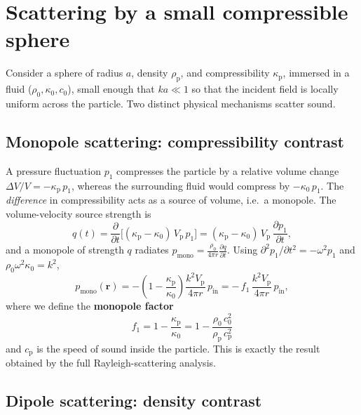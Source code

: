\documentclass[11pt]{article}
\newcommand{\pp}{\rho_{\mathrm{p}}}
\newcommand{\rrho}{\rho_{0}}
\newcommand{\cc}{c_{0}}
\newcommand{\kkp}{\kappa_{\mathrm{p}}}
\newcommand{\kkz}{\kappa_{0}}
\newcommand{\vp}{V_{\mathrm{p}}}
\newcommand{\rr}{\mathbf{r}}
\begin{document}
\section{Scattering by a small compressible sphere}
\label{sec:scattering}

Consider a sphere of radius $a$, density $\pp$, and compressibility $\kkp$,
immersed in a fluid ($\rrho,\kkz,\cc$), small enough that $ka\ll1$ so that the
incident field is locally uniform across the particle. Two distinct physical
mechanisms scatter sound.

\subsection{Monopole scattering: compressibility contrast}

A pressure fluctuation $p_{1}$ compresses the particle by a relative volume
change $\Delta V/V=-\kkp\,p_{1}$, whereas the surrounding fluid would compress
by $-\kkz\,p_{1}$. The \emph{difference} in compressibility acts as a source of
volume, i.e.\ a monopole. The volume-velocity source strength is
\begin{equation}
  q(t)=\frac{\partial}{\partial t}\Big[(\kkp-\kkz)\,\vp\,p_{1}\Big]
      =(\kkp-\kkz)\,\vp\,\frac{\partial p_{1}}{\partial t},
\end{equation}
and a monopole of strength $q$ radiates
$p_{\mathrm{mono}}=\frac{\rrho}{4\pi r}\frac{\partial q}{\partial t}$. Using
$\partial^{2}p_{1}/\partial t^{2}=-\omega^{2}p_{1}$ and
$\rrho\omega^{2}\kkz=k^{2}$,
\begin{equation}
  p_{\mathrm{mono}}(\rr)=-\left(1-\frac{\kkp}{\kkz}\right)
      \frac{k^{2}\vp}{4\pi r}\,p_{\mathrm{in}}
  =-\,f_{1}\,\frac{k^{2}\vp}{4\pi r}\,p_{\mathrm{in}},
  \label{eq:monopole}
\end{equation}
where we define the \textbf{monopole factor}
\begin{equation}
  \boxed{\;f_{1}=1-\frac{\kkp}{\kkz}
        =1-\frac{\rrho\,\cc^{2}}{\pp\,c_{\mathrm{p}}^{2}}\;}
  \label{eq:f1}
\end{equation}
and $c_{\mathrm{p}}$ is the speed of sound inside the particle. This is exactly
the result obtained by the full Rayleigh-scattering analysis.

\subsection{Dipole scattering: density contrast}
\end{document}
